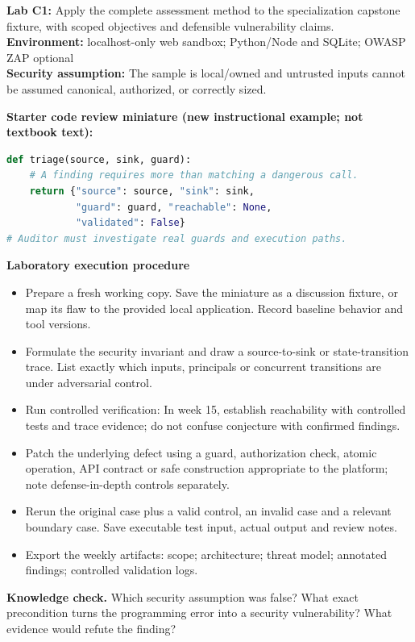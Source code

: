 \documentclass[10pt,letterpaper]{article}
\begin{document}
\begin{insight}\textbf{Lab C1:} Apply the complete assessment method to the specialization capstone fixture, with scoped objectives and defensible vulnerability claims.\\\textbf{Environment:} localhost-only web sandbox; Python/Node and SQLite; OWASP ZAP optional\\\textbf{Security assumption:} The sample is local/owned and untrusted inputs cannot be assumed canonical, authorized, or correctly sized.\end{insight}
\textbf{Starter code review miniature (new instructional example; not textbook text):}
\begin{lstlisting}[language=Python]
def triage(source, sink, guard):
    # A finding requires more than matching a dangerous call.
    return {"source": source, "sink": sink,
            "guard": guard, "reachable": None,
            "validated": False}
# Auditor must investigate real guards and execution paths.
\end{lstlisting}
\textbf{Laboratory execution procedure}
\begin{itemize}[leftmargin=*,itemsep=2pt]
\item Prepare a fresh working copy. Save the miniature as a discussion fixture, or map its flaw to the provided local application. Record baseline behavior and tool versions.
\item Formulate the security invariant and draw a source-to-sink or state-transition trace. List exactly which inputs, principals or concurrent transitions are under adversarial control.
\item Run controlled verification: In week 15, establish reachability with controlled tests and trace evidence; do not confuse conjecture with confirmed findings.
\item Patch the underlying defect using a guard, authorization check, atomic operation, API contract or safe construction appropriate to the platform; note defense-in-depth controls separately.
\item Rerun the original case plus a valid control, an invalid case and a relevant boundary case. Save executable test input, actual output and review notes.
\item Export the weekly artifacts: scope; architecture; threat model; annotated findings; controlled validation logs.
\end{itemize}
\textbf{Knowledge check.} Which security assumption was false? What exact precondition turns the programming error into a security vulnerability? What evidence would refute the finding?
\end{document}
